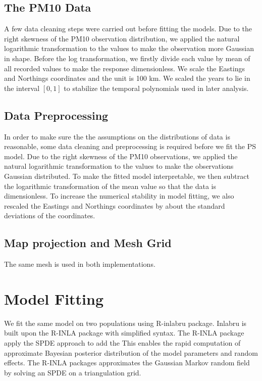 \subsection{The PM10 Data}
A few data cleaning steps were carried out before fitting the models. Due to the right skewness of 
the PM10 observation distribution, we applied the natural logarithmic transformation to the values
to make the observation more Gaussian in shape. Before the log transformation, we firstly divide
each value by mean of all recorded values to make the response dimensionless.
We scale the Eastings and Northings coordinates and the unit is 100 km. We scaled the years to
lie in the interval $[0, 1]$ to stabilize the temporal polynomials used in later analysis.

\subsection{Data Preprocessing}
In order to make sure the the assumptions on the distributions of data is reasonable, some data
cleaning and preprocessing is required before we fit the PS model. Due to the right skewness of the
PM10 observations, we applied the natural logarithmic transformation to the values to make the 
observations Gaussian distributed. To make the fitted model interpretable, we then subtract the 
logarithmic transformation of the mean value so that the data is dimensionless. To increase the 
numerical stability in model fitting, we also rescaled the Eastings and Northings coordinates by
about the standard deviations of the coordinates.

\subsection{Map projection and Mesh Grid}
The same mesh is used in both implementations. 


\section{Model Fitting}
We fit the same model on two populations using R-inlabru package. Inlabru is built upon the R-INLA 
package with simplified syntax. The R-INLA package apply the SPDE approach to add the
This enables the rapid computation of approximate Bayesian posterior distribution of the model 
parameters and random effects. The R-INLA packages approximates the Gaussian Markov random field by
solving an SPDE on a triangulation grid.
